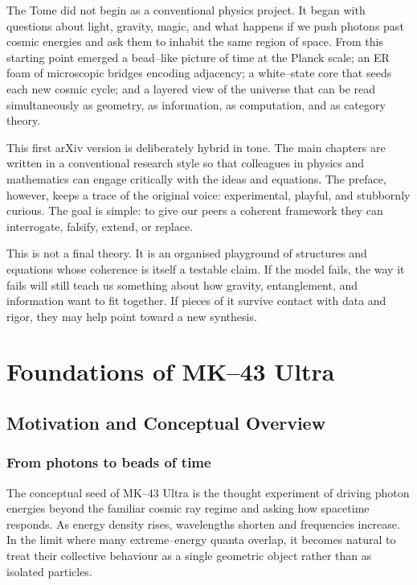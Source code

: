 \documentclass[11pt]{book}
\begin{document}
The Tome did not begin as a conventional physics project.
It began with questions about light, gravity, magic, and what happens if we push photons past cosmic energies and ask them to inhabit the same region of space.
From this starting point emerged a bead--like picture of time at the Planck scale; an ER foam of microscopic bridges encoding adjacency; a white--state core that seeds each new cosmic cycle; and a layered view of the universe that can be read simultaneously as geometry, as information, as computation, and as category theory.

This first arXiv version is deliberately hybrid in tone.
The main chapters are written in a conventional research style so that colleagues in physics and mathematics can engage critically with the ideas and equations.
The preface, however, keeps a trace of the original voice: experimental, playful, and stubbornly curious.
The goal is simple: to give our peers a coherent framework they can interrogate, falsify, extend, or replace.

This is not a final theory.
It is an organised playground of structures and equations whose coherence is itself a testable claim.
If the model fails, the way it fails will still teach us something about how gravity, entanglement, and information want to fit together.
If pieces of it survive contact with data and rigor, they may help point toward a new synthesis.

\mainmatter

\part{Foundations of MK--43 Ultra}

\chapter{Motivation and Conceptual Overview}

\section{From photons to beads of time}

The conceptual seed of MK--43 Ultra is the thought experiment of driving photon energies beyond the familiar cosmic ray regime and asking how spacetime responds.
As energy density rises, wavelengths shorten and frequencies increase.
In the limit where many extreme--energy quanta overlap, it becomes natural to treat their collective behaviour as a single geometric object rather than as isolated particles.
\end{document}
